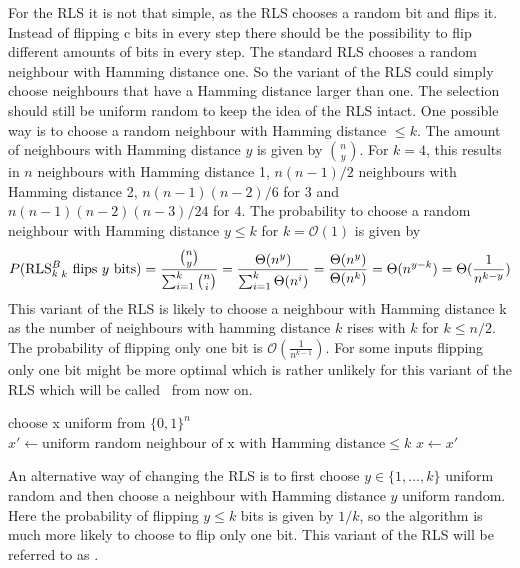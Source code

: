For the RLS it is not that simple, as the RLS chooses a random bit and flips it.
Instead of flipping c bits in every step there should be the possibility to flip different amounts of bits in every step.
The standard RLS chooses a random neighbour with Hamming distance one.
So the variant of the RLS could simply choose neighbours that have a Hamming distance larger than one.
The selection should still be uniform random to keep the idea of the RLS intact.
One possible way is to choose a random neighbour with Hamming distance $\le k$.
The amount of neighbours with Hamming distance $y$ is given by $\binom{n}{y}$.
For $k=4$, this results in $n$ neighbours with Hamming distance 1, $n(n-1)/2$ neighbours with Hamming distance 2, $n(n-1)(n-2)/6$ for 3
and $n(n-1)(n-2)(n-3)/24$ for 4.
The probability to choose a random neighbour with Hamming distance $y \le k$ for $k = \mathcal{O}(1)$ is given by
\[P(\text{RLS$^{B}_{k}$}_k\text{ flips }y\text{ bits}) = \frac{\binom{n}{y}}{\sum_{i=1}^k \binom{n}{i}} = \frac{\Theta(n^y)}{\sum_{i=1}^k \Theta(n^i)}
      = \frac{\Theta(n^y)}{\Theta(n^k)} = \Theta(n^{y-k}) = \Theta(\frac{1}{n^{k-y}})\]
This variant of the RLS is likely to choose a neighbour with Hamming distance k as the number of neighbours with hamming
distance $k$ rises with $k$ for $k \le n/2$.
The probability of flipping only one bit is $\mathcal{O}(\frac{1}{n^{k-1}})$.
For some inputs flipping only one bit might be more optimal which is rather unlikely for this variant of the RLS which will be called \RLSN~from now on.
\begin{algorithm}[bt]
      \caption{\textsc{\RLSN}}\label{alg:rlsN}

      \DontPrintSemicolon %

      \BlankLine
      choose x uniform from ${\{0,1\}}^n$\;
      {
      $x' \leftarrow \text{uniform random neighbour of x with Hamming distance} \le k$\;
      {
      {
            $x \leftarrow x'$\;
      }
      }
      }
\end{algorithm}

An alternative way of changing the RLS is to first choose $y \in \{1, \dots, k\}$ uniform random and then choose a neighbour with Hamming distance $y$ uniform random.
Here the probability of flipping $y \le k$ bits is given by $1/k$, so the algorithm is much more likely to choose to flip only one bit.
This variant of the RLS will be referred to as \RLSR.

